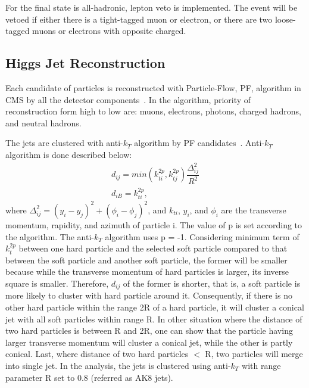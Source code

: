 For the final state is all-hadronic, lepton veto is implemented. The event will be vetoed if either there is a tight-tagged muon or electron, or there are two loose-tagged muons or electrons with opposite charged.

\subsection{Higgs Jet Reconstruction} 
Each candidate of particles is reconstructed with Particle-Flow, PF, algorithm in CMS by all the detector components~\citep{CMS-PAS-PFT-10-001,PFPAS2009}. In the algorithm, priority of reconstruction form high to low are: muons, electrons, photons, charged hadrons, and neutral hadrons.

The jets are clustered with anti-$k_{T}$ algorithm by PF candidates~\citep{antiKtAlgorithm}. Anti-$k_{T}$ algorithm is done described below: 
\begin{equation} \label{eq1}
\begin{split}
d_{ij} = min(k^{2p}_{ti},k^{2p}_{tj})\dfrac{\Delta ^2_{ij}}{R^2}\\
d_{iB} = k^{2p}_{ti}, 	
\end{split}
\end{equation}
where $\Delta ^{2}_{ij}= (y_{i}-y_{j})^2+(\phi_{i}-\phi_{j})^2$, and $k_{ti}$, $y_{i}$, and $\phi _{i}$ are the transverse momentum, rapidity, and azimuth of particle i. The value of p is set according to the algorithm. The anti-$k_{T}$ algorithm uses p = -1. 
Considering minimum term of $k^{2p}_{t}$ between one hard particle and the selected soft particle compared to that between the soft particle and another soft particle, the former will be smaller because while the transverse momentum of hard particles is larger, its inverse square is smaller. 
Therefore, $d_{ij}$ of the former is shorter, that is, a soft particle is more likely to cluster with hard particle around it. 
Consequently, if there is no other hard particle within the range 2R of a hard particle, it will cluster a conical jet with all soft particles within range R. 
In other situation where the distance of two hard particles is between R and 2R, one can show that the particle having larger transverse momentum will cluster a conical jet, while the other is partly conical.
Last, where distance of two hard particles $<$ R, two particles will merge into single jet. In the analysis, the jets is clustered using anti-$k_{T}$ with range parameter R set to 0.8 (referred as AK8 jets).

